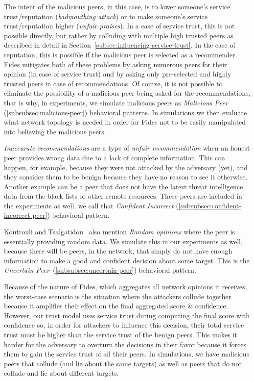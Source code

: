 The intent of the malicious peers, in this case, is to lower someone's service trust/reputation (\textit{badmouthing attack}) or to make someone's service trust/reputation higher (\textit{unfair praises}).
In a case of service trust, this is not possible directly, but rather by colluding with multiple high trusted peers as described in detail in Section~\ref{subsec:influencing-service-trust}.
In the case of reputation, this is possible if the malicious peer is selected as a recommender.
Fides mitigates both of these problems by asking numerous peers for their opinion (in case of service trust) and by asking only pre-selected and highly trusted peers in case of recommendations.
Of course, it is not possible to eliminate the possibility of a malicious peer being asked for the recommendations, that is why, in experiments, we simulate malicious peers as \textit{Malicious Peer} (\ref{subsubsec:malicious-peer}) behavioral patterns.
In simulations we then evaluate what network topology is needed in order for Fides not to be easily manipulated into believing the malicious peers.

\textit{Inaccurate recommendations} are a type of \textit{unfair recommendation} when an honest peer provides wrong data due to a lack of complete information.
This can happen, for example, because they were not attacked by the adversary (yet), and they consider them to be benign because they have no reason to see it otherwise.
Another example can be a peer that does not have the latest threat intelligence data from the black lists or other remote resources.
These peers are included in the experiments as well, we call that \textit{Confident Incorrect} (\ref{subsubsec:confident-incorrect-peer}) behavioral pattern.

Koutrouli and Tsalgatidou~\cite{KOUTROULI201247} also mention \textit{Random opinions} where the peer is essentially providing random data.
We simulate this in our experiments as well, because there will be peers, in the network, that simply do not have enough information to make a good and confident decision about some target.
This is the \textit{Uncertain Peer}~(\ref{subsubsec:uncertain-peer}) behavioral pattern.

Because of the nature of Fides, which aggregates all network opinions it receives, the worst-case scenario is the situation where the attackers collude together because it amplifies their effect on the final aggregated score \& confidence.
However, our trust model uses service trust during computing the final score with confidence so, in order for attackers to influence this decision, their total service trust must be higher than the service trust of the benign peers.
This makes it harder for the adversary to overturn the decisions in their favor because it forces them to gain the service trust of all their peers.
In simulations, we have malicious peers that collude (and lie about the same targets) as well as peers that do not collude and lie about different targets.

